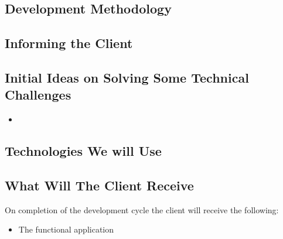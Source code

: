 \subsection{Development Methodology}


\subsection{Informing the Client}

\subsection{Initial Ideas on Solving Some Technical Challenges}
\begin{itemize}
	\item 
\end{itemize}

\subsection{Technologies We will Use}

\subsection{What Will The Client Receive}
On completion of the development cycle the client will receive the following:
\begin{itemize}
	\item The functional application
\end{itemize}
